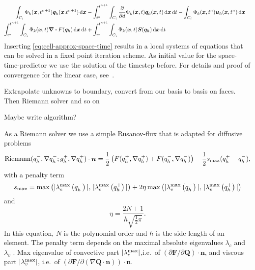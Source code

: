 \begin{align}\label{eq:space-time-predictor}
\begin{split}
\intdcell{
  \testfunction{k} (\bm{x}, t^{n+1}) \stpredictor(\bm{x}. t^{n+1})
}
&-
\intdt{\intdcell{
    \pdv{}{d} \testfunction{k}(\bm{x}, t) \stpredictor(\bm{x}, t)
}}
-
\intdcell{
  \testfunction{k}(\bm{x},t^n) \dsol(\bm{x}, t^n)
} = \\
\intdt{\intdcell{
    \testfunction{k}(\bm{x},t) \divergence{\flux(\stpredictor)}
}}
&+
\intdt{\intdcell{
    \testfunction{k}(\bm{x}, t) \source(\stpredictor)
}}
\end{split}
\end{align}
Inserting \cref{eq:cell-approx-space-time} results in a local systems of equations that can be solved in a fixed point iteration scheme.
As initial value for the space-time-predictor we use the solution of the timestep before.
For details and proof of convergence for the linear case, see~\cite{dumbser2008unified}.

Extrapolate unknowns to boundary, convert from our basis to basis on faces.
Then Riemann solver
and so on

Maybe write algorithm?




As a Riemann solver we use a simple Rusanov-flux that is adapted for diffusive problems
\begin{equation}
  \label{eq:rusanov-flux}
  \operatorname{Riemann}(q_h^-, \nabla q_h^-; g_h^+, \nabla q_h^+) \cdot \bm{n} =
  \frac{1}{2} \left(
    F(q_h^+, \nabla q_h^+) +
    F(q_h^-, \nabla q_h^-)
  \right) -
  \frac{1}{2} s_\text{max} (q_h^+ - q_h^-),
\end{equation}
with a penalty term
\begin{equation}
  \label{eq:parabolic-penalty}
  s_\text{max}  = \max \left(
\maxConvEigen[q_h^-], \, \maxConvEigen[q_h^+]
\right) +
2 \eta \max \left(
\maxViscEigen[q_h^-], \, \maxViscEigen[q_h^+]
\right)
\end{equation}
and
\begin{equation}
  \eta = \frac{2N+1}{h \sqrt{\frac{1}{2} \pi}}.
\end{equation}
In this equation, $N$ is the polynomial order and $h$ is the side-length of an element.
The penalty term depends on the maximal absolute eigenvalues $\lambda_c$ and $\lambda_v$ .
Max eigenvalue of convective part $\maxConvEigen$,i.e.\ of $\left( \partial \bm{F}/\partial \bm{Q}\right) \cdot \bm{n}$,
and viscous part $\maxViscEigen$, i.e.\ of $\left( \partial \bm{F}/\partial \left( \nabla \bm{Q} \cdot \bm{n} \right)\right) \cdot \bm{n}$.



